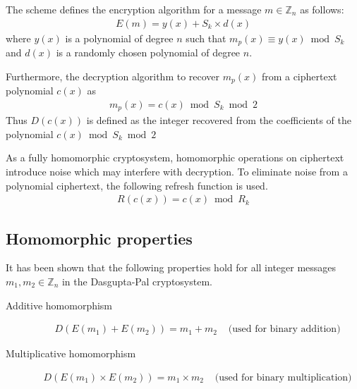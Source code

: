 The scheme defines the encryption algorithm for a message $m \in \mathbb{Z}_n$ as follows:
\begin{align*}
	E(m) = y(x) + S_k\times d(x)
\end{align*}
where
$y(x)$ is a polynomial of degree $n$ such that $m_p(x) \equiv y(x) \bmod S_k$ and $d(x)$ is a randomly chosen polynomial of degree $n$.

Furthermore, the decryption algorithm to recover $m_p(x)$ from a ciphertext polynomial $c(x)$ as
\begin{align*}
	m_p(x) = c(x) \bmod S_k \bmod 2
\end{align*}
Thus $D(c(x))$ is defined as the integer recovered from the coefficients of the polynomial $c(x) \bmod S_k \bmod 2$

As a fully homomorphic cryptosystem, homomorphic operations on ciphertext introduce noise which may interfere with decryption.
To eliminate noise from a polynomial ciphertext, the following refresh function is used.
\begin{align*}
	R(c(x)) = c(x) \bmod R_k
\end{align*}

\subsection{Homomorphic properties}
It has been shown \cite{dasgupta_design_2016} that the following properties hold for all integer messages $m_1, m_2 \in \mathbb{Z}_n$ in the Dasgupta-Pal cryptosystem.
\begin{description}
  \item[Additive homomorphism]
  \begin{align*}
    D(E(m_1) + E(m_2))= m_1+m_2 & \text{ (used for binary addition)}
  \end{align*}
  \item[Multiplicative homomorphism]
  \begin{align*}
    D(E(m_1) \times E(m_2))= m_1 \times m_2 & \text{ (used for binary multiplication)}
  \end{align*}
\end{description}

